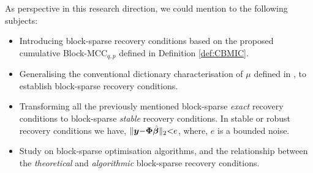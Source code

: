As perspective in this research direction, we could mention to the following subjects:
\begin{itemize}
\item Introducing block-sparse recovery conditions based on the proposed cumulative Block-MCC$_{q,p}$ defined in Definition \ref{def:CBMIC}.
\item Generalising the conventional dictionary characterisation of $\mu$ defined in \cite{Donoho2003}, to establish block-sparse recovery conditions.
\item  Transforming all the previously mentioned block-sparse \emph{exact} recovery conditions to block-sparse \emph{stable} recovery conditions.
In stable or robust recovery conditions we have, $\Vert \boldsymbol{y} {-} \boldsymbol{\Phi} \hat{\boldsymbol{\beta}} \Vert_{2} {<} e$, where, $e$ is a bounded noise.
\item Study on block-sparse optimisation algorithms, and the relationship between the \emph{theoretical} and \emph{algorithmic} block-sparse recovery conditions.
\end{itemize}